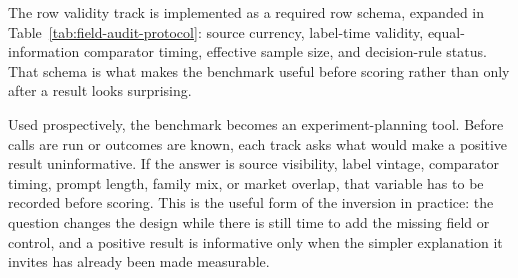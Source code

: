 \documentclass[11pt]{article}
\begin{document}
The row validity track is implemented as a required row schema, expanded in Table~\ref{tab:field-audit-protocol}: source currency, label-time validity, equal-information comparator timing, effective sample size, and decision-rule status. That schema is what makes the benchmark useful before scoring rather than only after a result looks surprising.

Used prospectively, the benchmark becomes an experiment-planning tool. Before calls are run or outcomes are known, each track asks what would make a positive result uninformative. If the answer is source visibility, label vintage, comparator timing, prompt length, family mix, or market overlap, that variable has to be recorded before scoring. This is the useful form of the inversion in practice: the question changes the design while there is still time to add the missing field or control, and a positive result is informative only when the simpler explanation it invites has already been made measurable.
\end{document}
